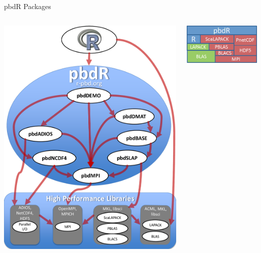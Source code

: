 \begin{frame}
  \begin{block}{pbdR Packages}
    \begin{center}
      \begin{columns}
        \begin{column}{.52\textwidth}
      \includegraphics[scale=.4]{pics/pbdR}
        \end{column}
        \hfill
        \begin{column}{.4\textwidth}
      \includegraphics[scale=.45]{pics/libs}
        \end{column}
      \end{columns}
    \end{center}
  \end{block}
\end{frame}


